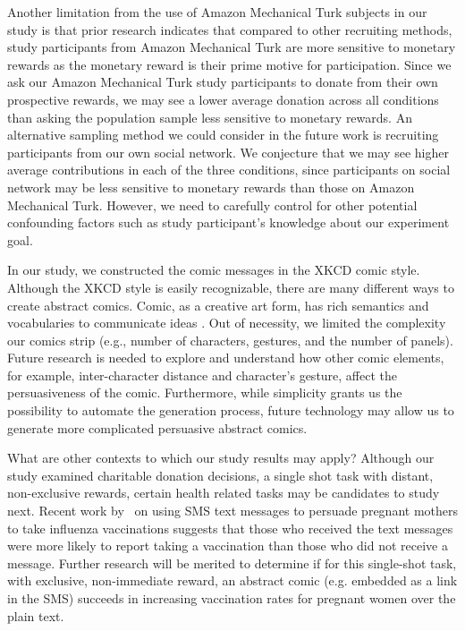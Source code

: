 \begin{description}[leftmargin=\parindent,topsep=0pt,partopsep=3pt,parsep=0pt,itemsep=3pt, listparindent=\parindent]
Another limitation from the use of Amazon Mechanical Turk subjects in our study is that prior research \cite{paolacci2010running,paolacci2014inside,kaufmann2011more} indicates that compared to other recruiting methods, study participants from Amazon Mechanical Turk are more sensitive to monetary rewards as the monetary reward is their prime motive for participation. Since we ask our Amazon Mechanical Turk study participants to donate from their own prospective rewards, we may see a lower average donation across all conditions than asking the population sample less sensitive to monetary rewards. An alternative sampling method we could consider in the future work is recruiting participants from our own social network. We conjecture that we may see higher average contributions in each of the three conditions, since participants on social network may be less sensitive to monetary rewards than those on Amazon Mechanical Turk. However, we need to carefully control for other potential confounding factors such as study participant's knowledge about our experiment goal. 

  \item[Comic Message Construction:] In our study, we constructed the comic messages in the XKCD comic style. Although the XKCD style is easily recognizable, there are many different ways to create abstract comics.  Comic, as a creative art form, has rich semantics and vocabularies to communicate ideas \cite{scott1993understanding}. Out of necessity, we limited the complexity our comics strip (e.g., number of characters, gestures, and the number of panels). Future research is needed to explore and understand how other comic elements, for example, inter-character distance and character's gesture, affect the persuasiveness of the comic. Furthermore, while simplicity grants us the possibility to automate the generation process, future technology may allow us to generate more complicated persuasive abstract comics.
  
    \item[Other Experimental Contexts:] What are other contexts to which our study results may apply? Although our study examined charitable donation decisions, a single shot task with distant, non-exclusive rewards, certain health related tasks may be candidates to study next. Recent work by~\textcite{Bushar2017} on using SMS text messages to persuade pregnant mothers to take influenza vaccinations suggests that those who received the text messages were more likely to report taking a vaccination than those who did not receive a message. Further research will be merited to determine if for this single-shot task, with exclusive, non-immediate reward, an abstract comic (e.g. embedded as a link in the SMS) succeeds in increasing vaccination rates for pregnant women over the plain text.
  
\end{description}
